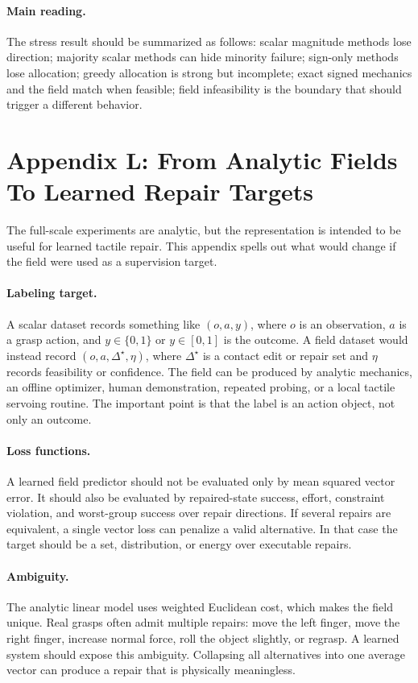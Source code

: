 \documentclass{article}
\begin{document}
\paragraph{Main reading.}
The stress result should be summarized as follows: scalar magnitude methods lose direction; majority scalar methods can hide minority failure; sign-only methods lose allocation; greedy allocation is strong but incomplete; exact signed mechanics and the field match when feasible; field infeasibility is the boundary that should trigger a different behavior.

\clearpage
\section{Appendix L: From Analytic Fields To Learned Repair Targets}

The full-scale experiments are analytic, but the representation is intended to be useful for learned tactile repair. This appendix spells out what would change if the field were used as a supervision target.

\paragraph{Labeling target.}
A scalar dataset records something like $(o,a,y)$, where $o$ is an observation, $a$ is a grasp action, and $y\in\{0,1\}$ or $y\in[0,1]$ is the outcome. A field dataset would instead record $(o,a,\Delta^\star,\eta)$, where $\Delta^\star$ is a contact edit or repair set and $\eta$ records feasibility or confidence. The field can be produced by analytic mechanics, an offline optimizer, human demonstration, repeated probing, or a local tactile servoing routine. The important point is that the label is an action object, not only an outcome.

\paragraph{Loss functions.}
A learned field predictor should not be evaluated only by mean squared vector error. It should also be evaluated by repaired-state success, effort, constraint violation, and worst-group success over repair directions. If several repairs are equivalent, a single vector loss can penalize a valid alternative. In that case the target should be a set, distribution, or energy over executable repairs.

\paragraph{Ambiguity.}
The analytic linear model uses weighted Euclidean cost, which makes the field unique. Real grasps often admit multiple repairs: move the left finger, move the right finger, increase normal force, roll the object slightly, or regrasp. A learned system should expose this ambiguity. Collapsing all alternatives into one average vector can produce a repair that is physically meaningless.
\end{document}
